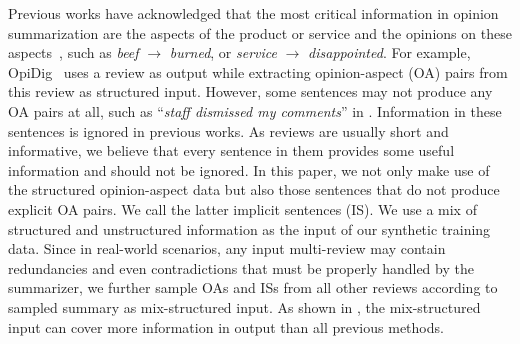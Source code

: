 Previous works have acknowledged that the most critical information in opinion summarization 
are the aspects of the product or service and the opinions on these aspects~\cite{AngelidisL18,MukherjeePVGBG20}, such as 
\textit{beef} $\rightarrow$ \textit{burned}, or
\textit{service} $\rightarrow$ \textit{disappointed}.
For example, OpiDig~\cite{OpiDig20} uses a review as output 
while extracting opinion-aspect (OA) pairs from this review as 
structured input.
However, some sentences may not produce any OA pairs at all, 
such as ``\textit{staff dismissed my comments}'' in .
Information in these sentences is ignored in previous works.
As reviews are usually short and informative,
we believe that every sentence in them provides some useful information and 
should not be ignored.
In this paper, we not only make use of the structured opinion-aspect data
but also those sentences that do not produce explicit OA pairs. We call the latter
implicit sentences (IS).  We use a mix of structured and unstructured information
as the input of our synthetic training data. 
Since in real-world scenarios,
any input multi-review may contain redundancies and even contradictions that must be properly
handled by the summarizer, 
we further sample OAs and ISs from all other reviews according to sampled summary
as mix-structured input.
As shown in , 
the mix-structured input can cover more information in output than all previous methods.


